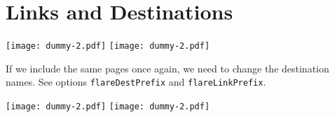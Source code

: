 \documentclass[a4paper]{article}
\begin{document}
\section{Links and Destinations}

\texttt{[image: dummy-2.pdf]}
\newpage
\texttt{[image: dummy-2.pdf]}


\newpage

If we include the same pages once again, we need to change
the destination names. See options \texttt{flareDestPrefix}
and \texttt{flareLinkPrefix}.

\texttt{[image: dummy-2.pdf]}
\newpage
\texttt{[image: dummy-2.pdf]}
\end{document}
